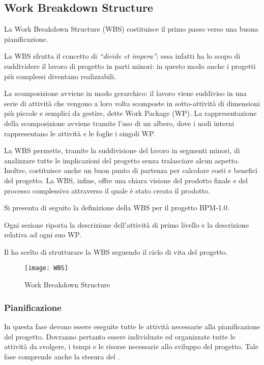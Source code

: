 \subsection{Work Breakdown Structure}

La Work Breakdown Structure (WBS) costituisce il primo passo verso una buona pianificazione.

La WBS sfrutta il concetto di \textit{``divide et impera''}; essa infatti ha lo scopo di suddividere il lavoro di progetto in parti minori: in questo modo anche i progetti più complessi diventano realizzabili.

La scomposizione avviene in modo gerarchico: il lavoro viene suddiviso in una serie di attività che vengono a loro volta scomposte in sotto-attività di dimensioni più piccole e semplici da gestire, dette Work Package (WP).
La rappresentazione della scomposizione avviene tramite l'uso di un albero, dove i nodi interni rappresentano le attività e le foglie i singoli WP\@.

La WBS permette, tramite la suddivisione del lavoro in segmenti minori, di analizzare tutte le implicazioni del progetto senza tralasciare alcun aspetto. Inoltre, costituisce anche un buon punto di partenza per calcolare costi e benefici del progetto.
La WBS, infine, offre una chiara visione del prodotto finale e del processo complessivo attraverso il quale è stato creato il prodotto.

Si presenta di seguito la definizione della WBS per il progetto BPM-1.0. 

Ogni sezione riporta la descrizione dell'attività di primo livello e la descrizione relativa ad ogni suo WP. 

Il  ha scelto di strutturare la WBS seguendo il ciclo di vita del progetto.

\begin{figure}[!h]
  \centering
  \texttt{[image: WBS]}
  \caption{Work Breakdown Structure}
\end{figure}

\subsubsection{Pianificazione}
In questa fase devono essere eseguite tutte le attività necessarie alla pianificazione del progetto.
Dovranno pertanto essere individuate ed organizzate tutte le attività da svolgere, i tempi e le risorse necessarie allo sviluppo del progetto. Tale fase comprende anche la stesura del .
		
